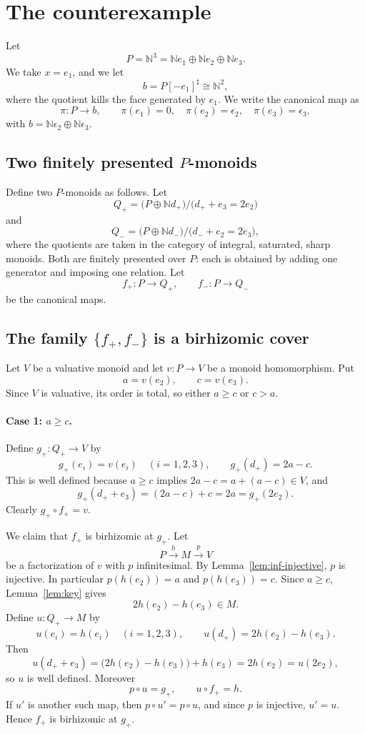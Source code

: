 \documentclass{article}
\theoremstyle{definition}
\newcommand{\bbN}{\mathbb N}
\begin{document}
\section{The counterexample}

Let
\[
P=\bbN^3=\bbN e_1\oplus \bbN e_2\oplus \bbN e_3.
\]
We take $x=e_1$, and we let
\[
b=P[-e_1]^\sharp\cong \bbN^2,
\]
where the quotient kills the face generated by $e_1$.  We write the canonical
map as
\[
\pi:P\longrightarrow b,\qquad
\pi(e_1)=0,\quad \pi(e_2)=\epsilon_2,\quad \pi(e_3)=\epsilon_3,
\]
with $b=\bbN\epsilon_2\oplus \bbN\epsilon_3$.

\subsection{Two finitely presented $P$-monoids}

Define two $P$-monoids as follows.  Let
\[
Q_+=\bigl(P\oplus \bbN d_+\bigr)\big/\!\bigl(d_+ + e_3=2e_2\bigr)
\]
and
\[
Q_-=\bigl(P\oplus \bbN d_-\bigr)\big/\!\bigl(d_- + e_2=2e_3\bigr),
\]
where the quotients are taken in the category of integral, saturated, sharp
monoids.  Both are finitely presented over $P$: each is obtained by adding one
generator and imposing one relation.  Let
\[
f_+:P\longrightarrow Q_+,\qquad f_-:P\longrightarrow Q_-
\]
be the canonical maps.

\subsection{The family $\{f_+,f_-\}$ is a birhizomic cover}

Let $V$ be a valuative monoid and let $v:P\to V$ be a monoid homomorphism.
Put
\[
a=v(e_2),\qquad c=v(e_3).
\]
Since $V$ is valuative, its order is total, so either $a\ge c$ or $c>a$.

\paragraph{Case 1: $a\ge c$.}
Define $g_+:Q_+\to V$ by
\[
g_+(e_i)=v(e_i)\quad(i=1,2,3),\qquad
g_+(d_+)=2a-c.
\]
This is well defined because $a\ge c$ implies $2a-c=a+(a-c)\in V$, and
\[
g_+(d_++e_3)=(2a-c)+c=2a=g_+(2e_2).
\]
Clearly $g_+\circ f_+=v$.

We claim that $f_+$ is birhizomic at $g_+$.  Let
\[
P \xrightarrow{h} M \xrightarrow{p} V
\]
be a factorization of $v$ with $p$ infinitesimal.  By Lemma~\ref{lem:inf-injective},
$p$ is injective.  In particular $p(h(e_2))=a$ and $p(h(e_3))=c$.
Since $a\ge c$, Lemma~\ref{lem:key} gives
\[
2h(e_2)-h(e_3)\in M.
\]
Define $u:Q_+\to M$ by
\[
u(e_i)=h(e_i)\quad(i=1,2,3),\qquad
u(d_+)=2h(e_2)-h(e_3).
\]
Then
\[
u(d_++e_3)=\bigl(2h(e_2)-h(e_3)\bigr)+h(e_3)=2h(e_2)=u(2e_2),
\]
so $u$ is well defined.  Moreover
\[
p\circ u=g_+,\qquad u\circ f_+=h.
\]
If $u'$ is another such map, then $p\circ u'=p\circ u$, and since $p$ is
injective, $u'=u$.  Hence $f_+$ is birhizomic at $g_+$.
\end{document}
